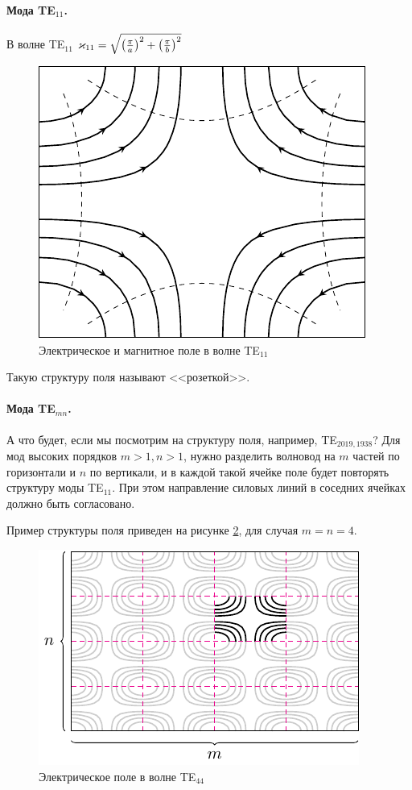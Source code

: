 \paragraph{Мода TE$_{11}$.} В волне TE$_{11}$ $\varkappa_{11}=\sqrt{\qty(\frac{\pi}{a})^2+\qty(\frac{\pi}{b})^2}$
\begin{figure}[H]
	\centering
	\includegraphics[scale=1.5]{img_lect5/rectangle/TE11}
	\caption{Электрическое и магнитное поле в волне TE$_{11}$}
	\label{fig:rectangle:TE11}
\end{figure}
Такую структуру поля называют <<розеткой>>.

\paragraph{Мода TE$_{mn}$.} А что будет, если мы посмотрим на структуру поля, например, TE$_{2019,1938}$? Для мод высоких порядков $m>1, n>1$, нужно разделить волновод на $m$ частей по горизонтали и $n$ по вертикали, и в каждой такой ячейке поле будет повторять структуру моды TE$_{11}$. При этом направление силовых линий в соседних ячейках должно быть согласовано.

Пример структуры поля приведен на рисунке \ref{fig:rectangle:TE44}, для случая $m=n=4$.
\begin{figure}[H]
	\centering
	\includegraphics[scale=1.5]{img_lect5/rectangle/TE44}
	\caption{Электрическое поле в волне TE$_{44}$}
	\label{fig:rectangle:TE44}
\end{figure}

